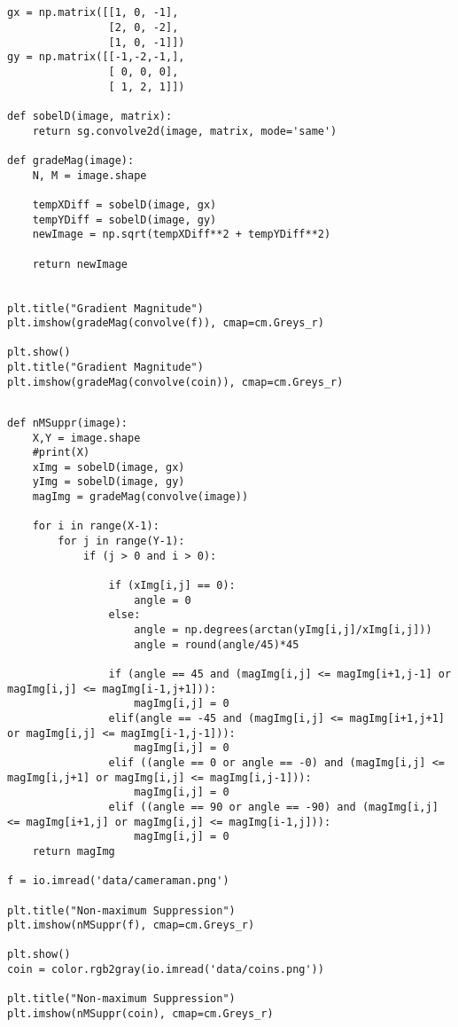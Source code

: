 \subsection{}
\begin{verbatim}
gx = np.matrix([[1, 0, -1],
                [2, 0, -2],
                [1, 0, -1]])
gy = np.matrix([[-1,-2,-1,],
                [ 0, 0, 0],
                [ 1, 2, 1]])

def sobelD(image, matrix):
    return sg.convolve2d(image, matrix, mode='same')

def gradeMag(image):
    N, M = image.shape

    tempXDiff = sobelD(image, gx)
    tempYDiff = sobelD(image, gy)
    newImage = np.sqrt(tempXDiff**2 + tempYDiff**2)

    return newImage


plt.title("Gradient Magnitude")
plt.imshow(gradeMag(convolve(f)), cmap=cm.Greys_r)

plt.show()
plt.title("Gradient Magnitude")
plt.imshow(gradeMag(convolve(coin)), cmap=cm.Greys_r)
\end{verbatim}

\subsection{}
\begin{verbatim}
def nMSuppr(image):
    X,Y = image.shape
    #print(X)
    xImg = sobelD(image, gx)
    yImg = sobelD(image, gy)
    magImg = gradeMag(convolve(image))
    
    for i in range(X-1):
        for j in range(Y-1):
            if (j > 0 and i > 0):
                
                if (xImg[i,j] == 0):
                    angle = 0
                else:
                    angle = np.degrees(arctan(yImg[i,j]/xImg[i,j]))
                    angle = round(angle/45)*45
                    
                if (angle == 45 and (magImg[i,j] <= magImg[i+1,j-1] or magImg[i,j] <= magImg[i-1,j+1])):
                    magImg[i,j] = 0
                elif(angle == -45 and (magImg[i,j] <= magImg[i+1,j+1] or magImg[i,j] <= magImg[i-1,j-1])):
                    magImg[i,j] = 0
                elif ((angle == 0 or angle == -0) and (magImg[i,j] <= magImg[i,j+1] or magImg[i,j] <= magImg[i,j-1])):
                    magImg[i,j] = 0
                elif ((angle == 90 or angle == -90) and (magImg[i,j] <= magImg[i+1,j] or magImg[i,j] <= magImg[i-1,j])):
                    magImg[i,j] = 0
    return magImg

f = io.imread('data/cameraman.png')

plt.title("Non-maximum Suppression")
plt.imshow(nMSuppr(f), cmap=cm.Greys_r)

plt.show()
coin = color.rgb2gray(io.imread('data/coins.png'))

plt.title("Non-maximum Suppression")
plt.imshow(nMSuppr(coin), cmap=cm.Greys_r)
\end{verbatim}

